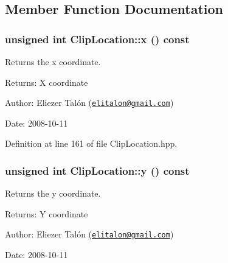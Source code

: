 \subsection{Member Function Documentation}
\hypertarget{class_clip_location_580a48aeda8a2714b14c25435da044b3}{
\subsubsection[x]{\setlength{\rightskip}{0pt plus 5cm}unsigned int ClipLocation::x () const}}
\label{class_clip_location_580a48aeda8a2714b14c25435da044b3}


Returns the x coordinate. 

\begin{Desc}
\item[Returns:]X coordinate\end{Desc}
\begin{Desc}
\item[Author:]Eliezer Talón (\href{mailto:elitalon@gmail.com}{\tt elitalon@gmail.com}) \end{Desc}
\begin{Desc}
\item[Date:]2008-10-11 \end{Desc}


Definition at line 161 of file ClipLocation.hpp.\hypertarget{class_clip_location_5677e50c8b19980344877fc6d8e0aec0}{
\subsubsection[y]{\setlength{\rightskip}{0pt plus 5cm}unsigned int ClipLocation::y () const}}
\label{class_clip_location_5677e50c8b19980344877fc6d8e0aec0}


Returns the y coordinate. 

\begin{Desc}
\item[Returns:]Y coordinate\end{Desc}
\begin{Desc}
\item[Author:]Eliezer Talón (\href{mailto:elitalon@gmail.com}{\tt elitalon@gmail.com}) \end{Desc}
\begin{Desc}
\item[Date:]2008-10-11 \end{Desc}


